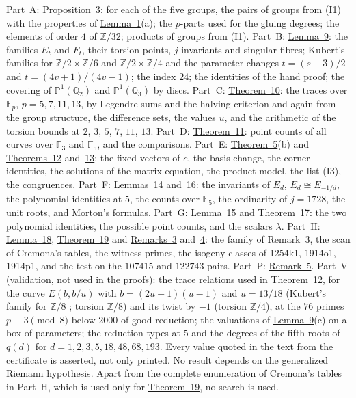 \documentclass[11pt]{article}
\newcommand{\Q}{\mathbb Q}
\newcommand{\Z}{\mathbb Z}
\newcommand{\F}{\mathbb F}
\begin{document}
Part~A: \hyperref[prop-parents]{Proposition~3}: for each of the five groups, the pairs of groups from (I1) with the
properties of \hyperref[lemma-gluing]{Lemma~1}(a); the \(p\)-parts used for the gluing degrees; the elements of order
\(4\) of \(\Z/32\); products of groups from (I1). Part~B: \hyperref[lemma-hlp]{Lemma~9}: the families \(E_t\) and
\(F_t\), their torsion points, \(j\)-invariants and singular fibres; Kubert's families for \(\Z/2\times\Z/6\) and
\(\Z/2\times\Z/4\) and the parameter changes \(t=(s-3)/2\) and \(t=(4v+1)/(4v-1)\); the index \(24\); the identities
of the hand proof; the covering of \(\mathbb P^1(\Q_2)\) and \(\mathbb P^1(\Q_3)\) by discs. Part~C:
\hyperref[thm-22212]{Theorem~10}: the traces over \(\F_p\), \(p=5,7,11,13\), by Legendre sums and the halving
criterion and again from the group structure, the difference sets, the values \(u\), and the arithmetic of the
torsion bounds at \(2\), \(3\), \(5\), \(7\), \(11\), \(13\). Part~D: \hyperref[thm-228]{Theorem~11}: point counts of
all curves over \(\F_3\) and \(\F_5\), and the comparisons. Part~E: \hyperref[thm-isotypic]{Theorem~5}(b) and
\hyperref[thm-88]{Theorems~12} and~\hyperref[thm-samej]{13}: the fixed vectors of \(c\), the basis change, the corner
identities, the solutions of the matrix equation, the product model, the list (I3), the congruences. Part~F:
\hyperref[lemma-five]{Lemmas~14} and~\hyperref[lemma-additive]{16}: the invariants of \(E_d\), \(E_d\cong E_{-1/d}\),
the polynomial identities at \(5\), the counts over \(\F_5\), the ordinarity of \(j=1728\), the unit roots, and
Morton's formulas. Part~G: \hyperref[lemma-kummer]{Lemma~15} and \hyperref[thm-25]{Theorem~17}: the two polynomial
identities, the possible point counts, and the scalars \(\lambda\). Part~H: \hyperref[lemma-nonsplit]{Lemma~18},
\hyperref[thm-25cond]{Theorem~19} and \hyperref[rem-family]{Remarks~3} and~\hyperref[rem-trace]{4}: the family of
Remark~3, the scan of Cremona's tables, the witness primes, the isogeny classes of 1254k1, 1914o1, 1914p1, and the
test on the \(107415\) and \(122743\) pairs. Part~P: \hyperref[rem-products]{Remark~5}. Part~V (validation, not used
in the proofs): the trace relations used in \hyperref[thm-88]{Theorem~12}, for the curve \(E(b,b/u)\) with
\(b=(2u-1)(u-1)\) and \(u=13/18\) (Kubert's family for \(\Z/8\) \cite[Table~3]{Ku}; torsion \(\Z/8\)) and its twist by
\(-1\) (torsion \(\Z/4\)), at the \(76\) primes \(p\equiv3\pmod8\) below \(2000\) of good reduction; the valuations of \hyperref[lemma-hlp]{Lemma~9}(c) on a box of
parameters; the reduction types at \(5\) and the degrees of the fifth roots of \(q(d)\) for \(d=1,2,3,5,18,48,68,
193\). Every value quoted in the text from the certificate is asserted, not only printed. No result depends on the
generalized Riemann hypothesis. Apart from the complete enumeration of Cremona's tables in Part~H, which is used only
for \hyperref[thm-25cond]{Theorem~19}, no search is used.
\end{document}

